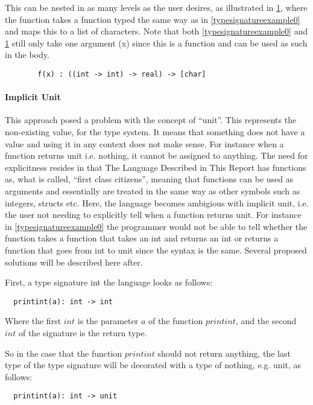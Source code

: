 This can be nested in as many levels as the user desires, as illustrated in \cref{typesignatureexample1}, where the function takes a function typed the same way as in \cref{typesignatureexample0} and maps this to a list of characters. Note that both \cref{typesignatureexample0} and \cref{typesignatureexample1} still only take one argument (x) since this is a function and can be used as such in the body.

\begin{figure}
\begin{lstlisting}
  f(x) : ((int -> int) -> real) -> [char]
\end{lstlisting}
\caption{}
\label{typesignatureexample1}
\end{figure}

\paragraph{Implicit Unit}
This approach posed a problem with the concept of \enquote{unit}. This represents the non-existing value, for the type system. It means that something does not have a value and using it in any context does not make sense. For instance when a function returns unit i.e. nothing, it cannot be assigned to anything. The need for explicitness resides in that The Language Described in This Report has functions as, what is called, \enquote{first class citizens}, meaning that functions can be used as arguments and essentially are treated in the same way as other symbols such as integers, structs etc. Here, the language becomes ambigious with implicit unit, i.e. the user not needing to explicitly tell when a function returns unit. For instance in \cref{typesignatureexample0} the programmer would not be able to tell whether the function takes a function that takes an int and returns an int or returns a function that goes from int to unit since the syntax is the same.
Several proposed solutions will be described here after.

First, a type signature int the language looks as follows:
\begin{verbatim}
  printint(a): int -> int
\end{verbatim}
Where the first $int$ is the parameter $a$ of the function $printint$, and the second $int$ of the signature is the return type.

So in the case that the function $printint$ should not return anything, the last type of the type signature will be decorated with a type of nothing, e.g. unit, as follows:
\begin{verbatim}
  printint(a): int -> unit
\end{verbatim}

